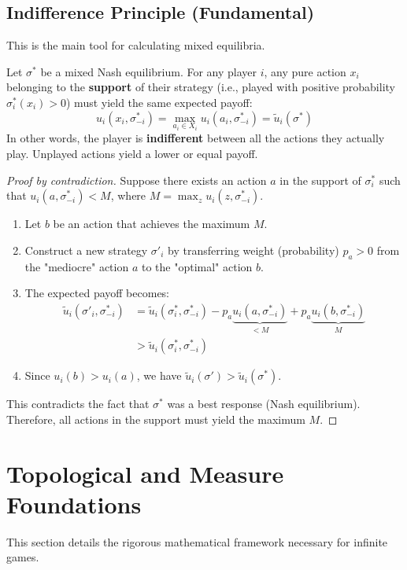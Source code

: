 \subsection{Indifference Principle (Fundamental)}
This is the main tool for calculating mixed equilibria.

\begin{proposition}
Let $\sigma^*$ be a mixed Nash equilibrium. For any player $i$, any pure action $x_i$ belonging to the \textbf{support} of their strategy (i.e., played with positive probability $\sigma^*_i(x_i) > 0$) must yield the same expected payoff:
$$u_i(x_i, \sigma^*_{-i}) = \max_{a_i \in X_i} u_i(a_i, \sigma^*_{-i}) = \tilde{u}_i(\sigma^*)$$
In other words, the player is \textbf{indifferent} between all the actions they actually play. Unplayed actions yield a lower or equal payoff.
\end{proposition}

\begin{proof}[Proof by contradiction]
Suppose there exists an action $a$ in the support of $\sigma_i^*$ such that $u_i(a, \sigma^*_{-i}) < M$, where $M = \max_{z} u_i(z, \sigma^*_{-i})$.
\begin{enumerate}
    \item Let $b$ be an action that achieves the maximum $M$.
    \item Construct a new strategy $\sigma'_i$ by transferring weight (probability) $p_a > 0$ from the "mediocre" action $a$ to the "optimal" action $b$.
    \item The expected payoff becomes:
    \begin{align*}
    \tilde{u}_i(\sigma'_i, \sigma^*_{-i}) &= \tilde{u}_i(\sigma^*_i, \sigma^*_{-i}) - p_a \underbrace{u_i(a, \sigma^*_{-i})}_{< M} + p_a \underbrace{u_i(b, \sigma^*_{-i})}_{M} \\
    &> \tilde{u}_i(\sigma^*_i, \sigma^*_{-i})
    \end{align*}
    \item Since $u_i(b) > u_i(a)$, we have $\tilde{u}_i(\sigma') > \tilde{u}_i(\sigma^*)$.
\end{enumerate}
This contradicts the fact that $\sigma^*$ was a best response (Nash equilibrium). Therefore, all actions in the support must yield the maximum $M$.
\end{proof}

\section{Topological and Measure Foundations}
This section details the rigorous mathematical framework necessary for infinite games.

